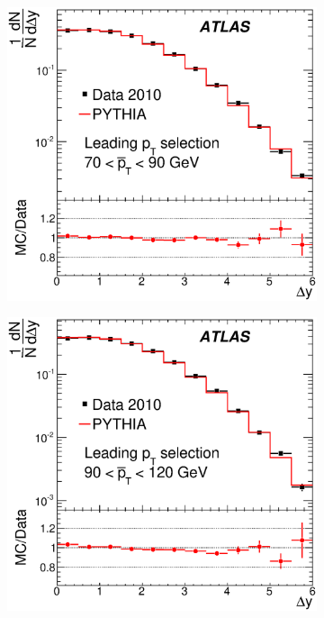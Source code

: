 \begin{figure}
\centering
        \begin{subfigure}[b]{0.5\textwidth}
                \centering
                \includegraphics[width=\textwidth]{figures/GBJ1/UncorrectedData/Inclusive_selA_Ave_pT_70_90_Norm.eps}
        \end{subfigure}%
        \begin{subfigure}[b]{0.5\textwidth}
                \centering
                \includegraphics[width=\textwidth]{figures/GBJ1/UncorrectedData/Inclusive_selA_Ave_pT_90_120_Norm.eps}
        \end{subfigure}%


\end{figure}
